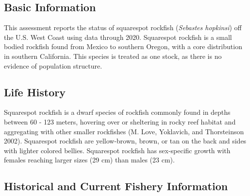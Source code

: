 \documentclass[11pt,
  english,
  a4paper,
]{article}
\begin{document}

\hypertarget{basic-information}{%
\subsection{Basic Information}\label{basic-information}}

\leavevmode\tagmcend\tagstructend


This assessment reports the status of squarespot rockfish (\emph{Sebastes hopkinsi}) off the U.S. West Coast using data through 2020. Squarespot rockfish is a small bodied rockfish found from Mexico to southern Oregon, with a core distribution in southern California. This species is treated as one stock, as there is no evidence of population structure.

\leavevmode\tagmcend\tagstructend\par


\hypertarget{life-history}{%
\subsection{Life History}\label{life-history}}

\leavevmode\tagmcend\tagstructend


Squarespot rockfish is a dwarf species of rockfish commonly found in depths between 60 - 123 meters, hovering over or sheltering in rocky reef habitat and aggregating with other smaller rockfishes {(M. Love, Yoklavich, and Thorsteinson 2002)\leavevmode\tagmcend\tagstructend}. Squarespot rockfish are yellow-brown, brown, or tan on the back and sides with lighter colored bellies. Squarespot rockfish has sex-specific growth with females reaching larger sizes (29 cm) than males (23 cm).

\leavevmode\tagmcend\tagstructend\par


\hypertarget{historical-and-current-fishery-information}{%
\subsection{Historical and Current Fishery Information}\label{historical-and-current-fishery-information}}
\end{document}
